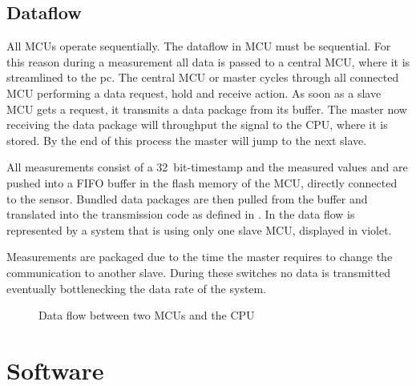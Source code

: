 



\subsection{Dataflow}

All \acs{MCU}s operate sequentially.
The dataflow in \ac{MCU} must be sequential. For this reason during a measurement all data is passed to a central \ac{MCU}, where it is streamlined to the pc. The central \ac{MCU} or master cycles through all connected \ac{MCU} performing a data request, hold and receive action. As soon as a slave \ac{MCU} gets a request, it transmits a data package from its buffer. The master now receiving the data package will throughput the signal to the \ac{CPU}, where it is stored. By the end of this process the master will jump to the next slave.

All measurements consist of a \SI{32}{bit}-timestamp and the measured values and are pushed into a \ac{FIFO} buffer in the flash memory of the \ac{MCU}, directly connected to the sensor. Bundled data packages are then pulled from the buffer and translated into the transmission code as defined in . In  the data flow is represented by a system that is using only one slave \ac{MCU}, displayed in violet.

Measurements are packaged due to the time the master requires to change the communication to another slave. During these switches no data is transmitted eventually bottlenecking the data rate of the system.

\begin{figure}[!htb]
    \centering
    
    \caption[Data flow]{Data flow between two \ac{MCU}s and the CPU}
    \label{fig:data_flow}
\end{figure}

\section{Software}

